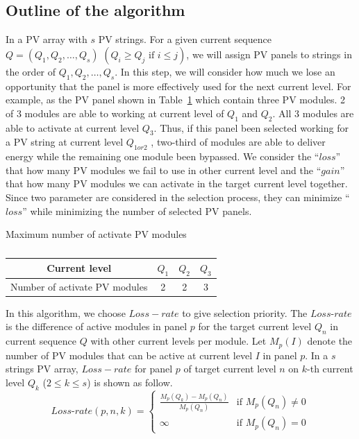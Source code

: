 \documentclass[journal]{IEEEtran}
\begin{document}
\subsection{Outline of the algorithm}\label{sec:outline-algorithm}
In a PV array with $s$ PV strings.
For a given current sequence $Q = (Q_{1},Q_{2},\ldots ,Q_{s})$ $(Q_{i} \geq Q_{j} \mbox{\ if\ } i \leq j)$, we will assign PV panels to strings in the order of $Q_{1},Q_{2},\ldots ,Q_{s}$.
In this step, we will consider how much we lose an opportunity that the panel is more effectively used for the next current level.
For example, as the PV panel shown in Table~\ref{tab:NumofModules} which contain three PV modules.
2 of 3 modules are able to working at current level of $Q_{1}$ and $Q_{2}$.
All 3 modules are able to activate at current level $Q_{3}$.
Thus, if this panel been selected working for a PV string at current level $Q_{1 or 2}$ , two-third of modules are able to deliver energy while the remaining one module been bypassed.
We consider the ``$loss$'' that how many PV modules we fail to use in other current level and the ``$gain$'' that how many PV modules we can activate in the target current level together.
Since two parameter are considered in the selection process, they can minimize ``$loss$'' while minimizing the number of selected PV panels.
\begin{table}[tbp]
  \caption[]{}
  \label{tab:NumofModules} 
  \centerline{Maximum number of activate PV modules}
  \vskip5pt
  \begin{center}
  \begin{tabular}{c|c|c|c}
    \hline
    Current level                 & $Q_{1}$ & $Q_{2}$ & $Q_{3}$  \\ \hline
    Number of activate PV modules & 2  & 2    & 3        \\ \hline
  \end{tabular}
  \end{center}
\end{table}
In this algorithm, we choose $Loss-rate$ to give selection priority.
The $Loss$-$rate$ is the difference of active modules in panel $p$ for the target current level $Q_n$  in current sequence $Q$ with other current levels per module.
Let $M_{p}(I)$ denote the number of PV modules that can be active at current level $I$ in panel $p$.
In a $s$ strings PV array, $Loss-rate$ for panel $p$ of target current level $n$ on $k$-th current level $Q_{k}$ ($2 \leq k \leq s$) is shown as follow.
\begin{equation}\label{eq:4}
    Loss\mbox{-}rate(p,n,k) =
    \begin{cases}
    \frac{M_{p}(Q_{k})-M_{p}(Q_{n})}{M_{p}(Q_{n})} & \mbox{if } M_{p}(Q_{n}) \neq 0 \\
    \infty & \mbox{if } M_{p}(Q_{n}) = 0
  \end{cases}
\end{equation}
\end{document}
